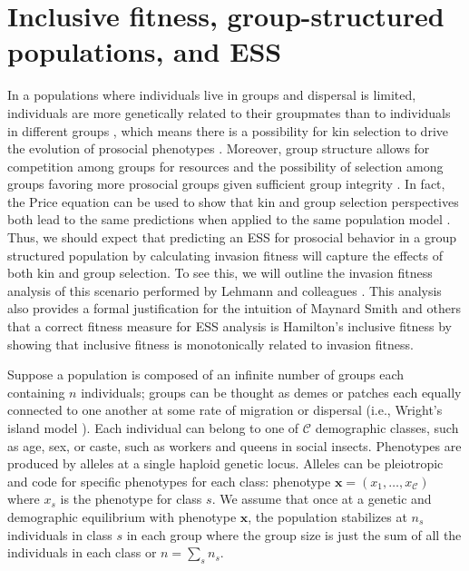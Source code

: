 \documentclass[11pt]{article}
\renewcommand{\vec}[1]{\symbf{#1}}
\newcommand{\numc}{\mathcal{C}}
\begin{document}
\section{Inclusive fitness, group-structured populations, and ESS}

In a populations where individuals live in groups and dispersal is limited, individuals are more genetically related to their groupmates than to individuals in different groups \cite{Wright:1943,Wright:1951,Hamilton:1970}, which means there is a possibility for kin selection to drive the evolution of prosocial phenotypes \cite{Hamilton:1964,Rousset:2004,Lehmann:Rousset:2014}. Moreover, group structure allows for competition among groups for resources and the possibility of selection among groups favoring more prosocial groups given sufficient group integrity \cite{Hamilton:1975,Wilson:Pollock:1992,Traulsen:Nowak:2006,Gardner:West:2006,Lehmann:Rousset:2010}. In fact, the Price equation \cite{Price:1970,Price:1972:cov} can be used to show that kin and group selection perspectives both lead to the same predictions when applied to the same population model \cite{Queller:1992,Lehmann:Keller:2007,Bijma:Wade:2008,Gardner:Grafen:2009,Marshall:2011,Akcay:VanCleve:2012}. Thus, we should expect that predicting an ESS for prosocial behavior in a group structured population by calculating invasion fitness will capture the effects of both kin and group selection. To see this, we will outline the invasion fitness analysis of this scenario performed by Lehmann and colleagues \cite{Lehmann:Mullon:2016,Lehmann:Rousset:2020}. This analysis also provides a formal justification for the intuition of Maynard Smith \cite{MaynardSmith:1978} and others that a correct fitness measure for ESS analysis is Hamilton's inclusive fitness \cite{Hamilton:1964} by showing that inclusive fitness is monotonically related to invasion fitness.

Suppose a population is composed of an infinite number of groups each containing $n$ individuals; groups can be thought as demes or patches each  equally connected to one another at some rate of migration or dispersal (i.e., Wright's island model \cite{Wright:1931}). Each individual can belong to one of $\numc$ demographic classes, such as age, sex, or caste, such as workers and queens in social insects. Phenotypes are produced by alleles at a single haploid genetic locus. Alleles can be pleiotropic and code for specific phenotypes for each class: phenotype $\vec{x}=(x_{1},\ldots,x_{\numc})$ where $x_{s}$ is the phenotype for class $s$. We assume that once at a genetic and demographic equilibrium with phenotype $\vec{x}$, the population stabilizes at $n_{s}$ individuals in class $s$ in each group where the group size is just the sum of all the individuals in each class or $n = \sum_{s} n_{s}$.
\end{document}
